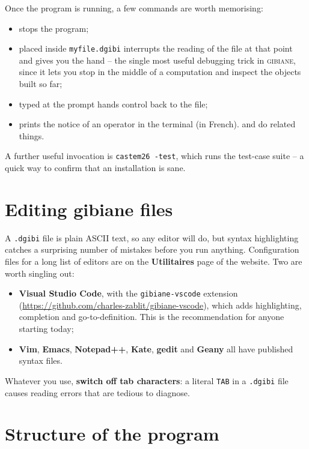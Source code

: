 \noindent Once the program is running, a few commands are worth memorising:

\begin{itemize}
\item {} stops the program;
\item {} placed inside \texttt{myfile.dgibi} interrupts the
  reading of the file at that point and gives you the hand -- the single most
  useful debugging trick in \textsc{gibiane}, since it lets you stop in the
  middle of a computation and inspect the objects built so far;
\item {} typed at the prompt hands control back to the file;
\item {} prints the notice of an operator in the
  terminal (in French).  and  do related things.
\end{itemize}

\noindent A further useful invocation is \texttt{castem26 -test}, which runs
the test-case suite -- a quick way to confirm that an installation is sane.

\section{Editing gibiane files}
\label{sec:intro:editing}

A \texttt{.dgibi} file is plain ASCII text, so any editor will do, but syntax
highlighting catches a surprising number of mistakes before you run anything.
Configuration files for a long list of editors are on the
\textbf{Utilitaires} page of the website. Two are worth singling out:

\begin{itemize}
\item \textbf{Visual Studio Code}, with the \texttt{gibiane-vscode} extension
  (\url{https://github.com/charles-zablit/gibiane-vscode}), which adds
  highlighting, completion and go-to-definition. This is the recommendation
  for anyone starting today;
\item \textbf{Vim}, \textbf{Emacs}, \textbf{Notepad++}, \textbf{Kate},
  \textbf{gedit} and \textbf{Geany} all have published syntax files.
\end{itemize}

\noindent Whatever you use, \textbf{switch off tab characters}: a literal
\texttt{TAB} in a \texttt{.dgibi} file causes reading errors that are tedious
to diagnose.

\section{Structure of the program}


